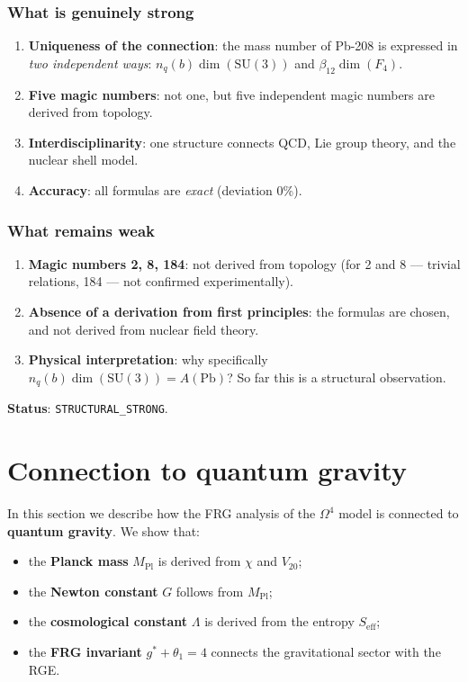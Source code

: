 \documentclass[11pt,a4paper]{article}
\newcommand{\SU}{\ensuremath{\mathrm{SU}}}
\newcommand{\Om}{\ensuremath{\Omega^4}}
\theoremstyle{definition}
\begin{document}
\subsubsection{What is genuinely strong}

\begin{enumerate}
    \item \textbf{Uniqueness of the connection}: the mass number of Pb-208
          is expressed in \emph{two independent ways}:
          $n_q(b) \dim(\SU(3))$ and $\beta_{12} \dim(F_4)$.
    \item \textbf{Five magic numbers}: not one, but five
          independent magic numbers are derived from topology.
    \item \textbf{Interdisciplinarity}: one structure connects
          QCD, Lie group theory, and the nuclear shell model.
    \item \textbf{Accuracy}: all formulas are \emph{exact} (deviation 0\%).
\end{enumerate}

\subsubsection{What remains weak}

\begin{enumerate}
    \item \textbf{Magic numbers 2, 8, 184}: not derived
          from topology (for 2 and 8 --- trivial relations,
          184 --- not confirmed experimentally).
    \item \textbf{Absence of a derivation from first principles}: the formulas
          are chosen, and not derived from nuclear field theory.
    \item \textbf{Physical interpretation}: why specifically
          $n_q(b) \dim(\SU(3)) = A(\text{Pb})$?
          So far this is a structural observation.
\end{enumerate}

\medskip\noindent
\textbf{Status}: \texttt{STRUCTURAL\_STRONG}.
\section{Connection to quantum gravity}
\label{sec:quantum-gravity}

In this section we describe how the FRG analysis of the $\Om$ model
is connected to \textbf{quantum gravity}. We show that:
\begin{itemize}
    \item the \textbf{Planck mass} $M_{\text{Pl}}$ is derived
          from $\chi$ and $V_{20}$;
    \item the \textbf{Newton constant} $G$ follows from $M_{\text{Pl}}$;
    \item the \textbf{cosmological constant} $\Lambda$ is derived
          from the entropy $S_{\text{eff}}$;
    \item the \textbf{FRG invariant} $g^* + \theta_1 = 4$ connects
          the gravitational sector with the RGE.
\end{itemize}
\end{document}
